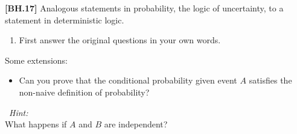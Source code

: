 \begin{exercise}
	\textbf{[BH.17]}  Analogous statements in probability, the logic of uncertainty, to a statement in deterministic logic.  
	\begin{enumerate}
		\item First answer the original questions in your own words.
	\end{enumerate}
Some extensions:
\begin{itemize}
	\item Can you prove that the conditional probability given event $A$ satisfies the non-naive definition of probability?
\end{itemize}
	\begin{hint}~\textit{Hint:}\\
		What happens if $A$ and $B$ are independent?
	\end{hint}
\end{exercise}

